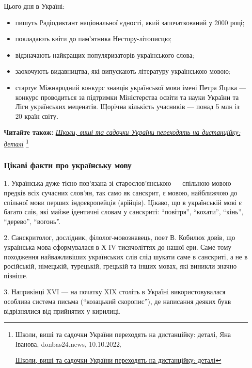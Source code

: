 Цього дня в Україні:

\begin{itemize} %
\item пишуть Радіодиктант національної єдності, який започаткований у 2000 році;
\item покладають квіти до пам'ятника Нестору-літописцю;
\item відзначають найкращих популяризаторів українського слова;
\item заохочують видавництва, які випускають літературу українською мовою;
\item стартує Міжнародний конкурс знавців української мови імені Петра Яцика — конкурс проводиться за підтримки Міністерства освіти та науки України та Ліги українських меценатів. Щорічна кількість учасників — понад 5 млн із 20 країн світу.
\end{itemize} %


\textbf{Читайте також:} \href{https://donbas24.news/news/skoli-visi-ta-sadocki-ukrayini-perexodyat-na-distanciiku-detali}{\emph{Школи, виші та садочки України переходять на дистанційку: деталі}}%
\footnote{Школи, виші та садочки України переходять на дистанційку: деталі, Яна Іванова, donbas24.news, 10.10.2022, \par%
\url{Школи, виші та садочки України переходять на дистанційку: деталі}%
}

\subsubsection{Цікаві факти про українську мову}

1. Українська дуже тісно пов'язана зі старослов'янською — спільною мовою
предків всіх сучасних слов'ян, так само як санскрит, є мовою, найближчою до
спільної мови перших індоєвропейців (арійців). Цікаво, що в українській мові є
багато слів, які майже ідентичні словам у санскриті: \enquote{повітря}, \enquote{кохати},
\enquote{кінь}, \enquote{дерево}, \enquote{вогонь}.

2. Санскритолог, дослідник, філолог-мовознавець, поет В. Кобилюх довів, що
українська мова сформувалася в Х-IV тисячоліттях до нашої ери. Саме тому
походження найважливіших українських слів слід шукати саме в санскриті, а не в
російській, німецькій, турецькій, грецькій та інших мовах, які виникли значно
пізніше.

3. Наприкінці XVI — на початку XIX століть в Україні використовувалася особлива
система письма (\enquote{козацький скоропис}), де написання деяких букв відрізнялися
від прийнятих у кирилиці.

